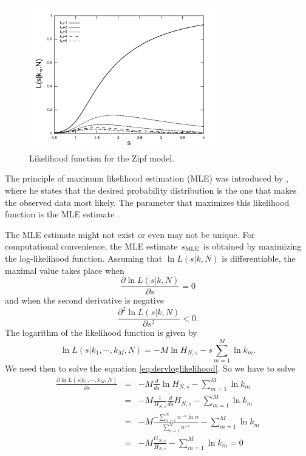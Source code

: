 \begin{figure}[h!]
\centering
\includegraphics[width=0.75\textwidth]{images/zipf_likelihood_k.pdf}
\caption{Likelihood function for the Zipf model.}
\label{fig:zipf_likelihood_k}
\end{figure} 

The principle of maximum likelihood estimation (MLE) was introduced by \cite{fisher1922}, 
where he states that the desired probability distribution is the one that makes the observed data
most likely. The parameter that maximizes this likelihood function is the MLE estimate \citep{aldrich1997}.


The MLE estimate might not exist or even may not be unique. For computational convenience,
the MLE estimate $s_{\textmd{MLE}}$ is obtained by maximizing the log-likelihood function.
Assuming that $\ln L(s|k,N)$ is differentiable, the maximal value takes place when
\begin{equation}
\label{eq:dervloglikelihood}
\frac{\partial \ln L(s|k,N)}{\partial s} = 0 
\end{equation}
and when the second derivative is negative 
\begin{equation}
\frac{\partial^2 \ln L(s|k,N)}{\partial s^2} < 0 .
\end{equation}
The logarithm of the likelihood function is given by
\begin{equation}
\ln L(s|k_1,\cdots,k_M,N) = -M \ln H_{N,s} - s \sum_{m=1}^{M} \ln k_m .
\end{equation}
We need then to solve the equation \ref{eq:dervloglikelihood}. So we have to solve
\begin{eqnarray}
\label{eq:derivloglikeeqzero}
\frac{\partial \ln L(s|k_1,\cdots,k_M,N)}{\partial s} &=& - M \frac{d}{ds} \ln H_{N,s}  - \sum_{m=1}^{M} \ln k_m  \nonumber \\
	&=& -M \frac{1}{H_{N,s}} \frac{d}{ds} H_{N,s} - \sum_{m=1}^{M} \ln k_m  \nonumber \\
	&=& -M \frac{- \sum_{n=1}^{N} n^{-s} \ln n }{\sum_{n=1}^{N} n^{-s}} - \sum_{m=1}^{M} \ln k_m  \nonumber \\
	&=& -M \frac{G_{N,s}}{H_{N,s}} - \sum_{m=1}^{M} \ln k_m  = 0
\end{eqnarray}

